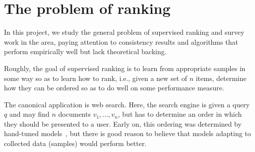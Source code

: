 \section{The problem of ranking}
In this project, we study the general problem of supervised ranking and survey
work in the area, paying attention to consistency results and
algorithms that perform empirically well but lack theoretical backing.

Roughly, the goal of supervised ranking is to learn from appropriate samples
in some way so as to learn how to rank, i.e., given a new set of $n$ items,
determine how they can be ordered so as to do well on some performance measure.

The canonical application is web search. Here, the search engine is given
a query $q$ and may find $n$ documents $v_1, \ldots, v_n$, but
has to determine an order in which they should be presented to a user.
Early on, this ordering was determined by hand-tuned models~\cite{bm25},
but there is good reason to believe that models adapting to collected data
(samples) would perform better. 

